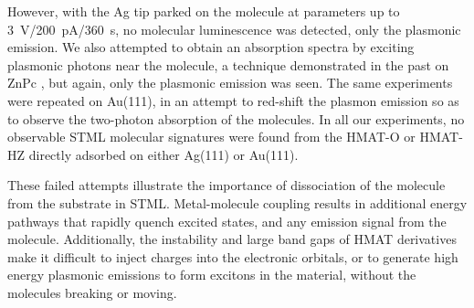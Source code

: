 However, with the Ag tip parked on the molecule at parameters up to \SI{3}{V}/\SI{200}{pA}/\SI{360}{s}, no molecular luminescence was detected, only the plasmonic emission. We also attempted to obtain an absorption spectra by exciting plasmonic photons near the molecule, a technique demonstrated in the past on ZnPc \cite{zhang2017sub}, but again, only the plasmonic emission was seen. The same experiments were repeated on Au(111), in an attempt to red-shift the plasmon emission so as to observe the two-photon absorption of the molecules. In all our experiments, no observable \ac{STML} molecular signatures were found from the HMAT-O or HMAT-HZ directly adsorbed on either Ag(111) or Au(111). 

These failed attempts illustrate the importance of dissociation of the molecule from the substrate in \ac{STML}. Metal-molecule coupling results in additional energy pathways that rapidly quench excited states, and any emission signal from the molecule. Additionally, the instability and large band gaps of \ac{HMAT} derivatives make it difficult to inject charges into the electronic orbitals, or to generate high energy plasmonic emissions to form excitons in the material, without the molecules breaking or moving. 




